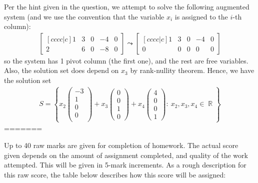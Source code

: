 \documentclass[answers,11pt]{exam}
\theoremstyle{definition}
\theoremstyle{definition}
\DeclareMathOperator{\R}{\mathbb{R}}
\DeclareMathOperator{\1}{\mathbbm{1}}
\newcommand{\condset}[4]{\left\{ #1  : \: #2 #3 #4 \right\}}
\begin{document}
\begin{questions}
\begin{solution}
	Per the hint given in the question, we attempt to solve the following augmented system (and we use the convention that the variable $x_i$ is assigned to the $i$-th column):
	\begin{align*}
	\begin{bmatrix}[c c c c | c]
	1 & 3 & 0 & -4 & 0 \\ 2 & 6 & 0 & -8 & 0
	\end{bmatrix} \leadsto \begin{bmatrix}[c c c c | c]
	1 & 3 & 0 & -4 & 0 \\ 0 & 0 & 0 & 0 & 0
	\end{bmatrix}
	\end{align*}
	so the system has 1 pivot column (the first one), and the rest are free variables. Also, the solution set does depend on $x_3$ by rank-nullity theorem. Hence, we have the solution set
	\begin{align}
	\label{eq2}
	\tag{$\ast$}
	S = \condset{ x_2 \begin{pmatrix} -3 \\ 1 \\ 0 \\ 0 \\\end{pmatrix} + x_3 \begin{pmatrix} 0 \\ 0 \\ 1 \\ 0 \end{pmatrix} + x_4 \begin{pmatrix} 4 \\ 0 \\ 0 \\ 1 \end{pmatrix} }{x_2, x_3, x_4}{ \in}{ \R}
	\end{align}
=======
	\item Up to 40 raw marks are given for completion of homework. The actual score given depends on the amount of assignment completed, and quality of the work attempted. This will be given in 5-mark increments. As a rough description for this raw score, the table below describes how this score will be assigned:
	

\end{solution}
\end{questions}
\end{document}
